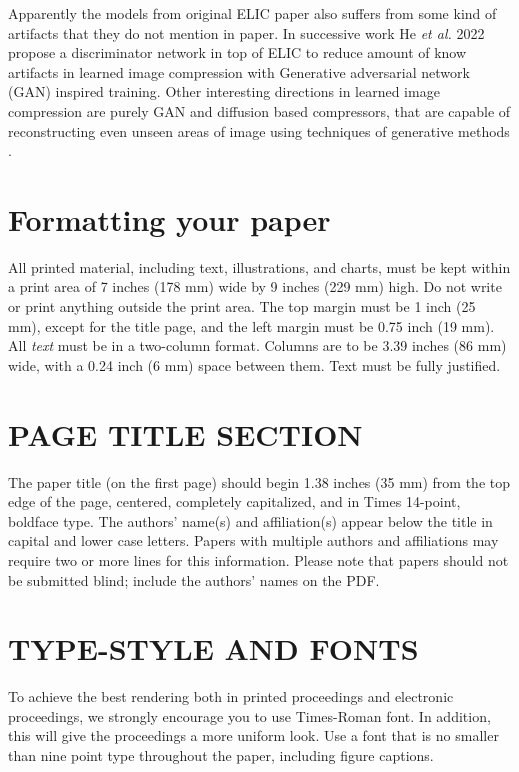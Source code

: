 \documentclass{article}
\begin{document}
Apparently the models from original ELIC paper also suffers from some kind of artifacts that they do not mention in paper. In successive work He \textit{et al.} 2022 \cite{PO-ELIC} propose a discriminator network in top of ELIC to reduce amount of know artifacts in learned image compression with Generative adversarial network (GAN) inspired training. Other interesting directions in learned image compression are purely GAN and diffusion based compressors, that are capable of reconstructing even unseen areas of image using techniques of generative methods \cite{HIFIC, diffusion}. 

\vfill\pagebreak
\vfill\pagebreak

\section{Formatting your paper}
\label{sec:format}

All printed material, including text, illustrations, and charts, must be kept
within a print area of 7 inches (178 mm) wide by 9 inches (229 mm) high. Do
not write or print anything outside the print area. The top margin must be 1
inch (25 mm), except for the title page, and the left margin must be 0.75 inch
(19 mm).  All {\it text} must be in a two-column format. Columns are to be 3.39
inches (86 mm) wide, with a 0.24 inch (6 mm) space between them. Text must be
fully justified.

\section{PAGE TITLE SECTION}
\label{sec:pagestyle}

The paper title (on the first page) should begin 1.38 inches (35 mm) from the
top edge of the page, centered, completely capitalized, and in Times 14-point,
boldface type.  The authors' name(s) and affiliation(s) appear below the title
in capital and lower case letters.  Papers with multiple authors and
affiliations may require two or more lines for this information. Please note
that papers should not be submitted blind; include the authors' names on the
PDF.

\section{TYPE-STYLE AND FONTS}
\label{sec:typestyle}

To achieve the best rendering both in printed proceedings and electronic proceedings, we
strongly encourage you to use Times-Roman font.  In addition, this will give
the proceedings a more uniform look.  Use a font that is no smaller than nine
point type throughout the paper, including figure captions.
\end{document}
